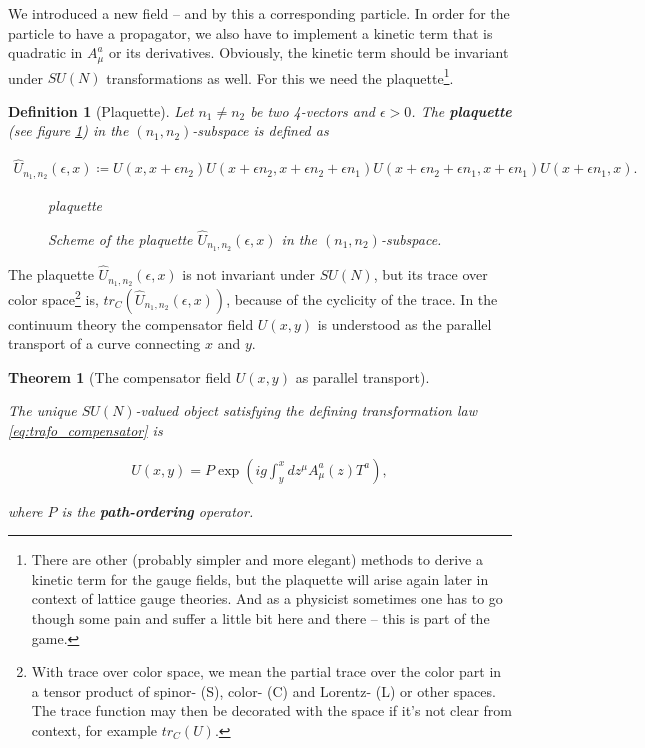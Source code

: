 \documentclass{article}
\theoremstyle{plain} %
\newtheorem{theorem}{Theorem}[section]
\newtheorem{definition}{Definition}[section]
\theoremstyle{convention} %
\theoremstyle{remark} %
\def\df#1{\textbf{\textit{#1}}}
\numberwithin{equation}{section}
\begin{document}
We introduced a new field -- and by this a corresponding particle. In order for the particle to have a propagator, we also have to implement a kinetic term that is quadratic in $A_{\mu}^a$ or its derivatives. Obviously, the kinetic term should be invariant under $SU(N)$ transformations as well. For this we need the plaquette\footnote{There are other (probably simpler and more elegant) methods to derive a kinetic term for the gauge fields, but the plaquette will arise again later in context of lattice gauge theories. And as a physicist sometimes one has to go though some pain and suffer a little bit here and there -- this is part of the game.}.

\begin{definition}[Plaquette]

Let $n_1 \neq n_2$ be two 4-vectors and $\epsilon > 0$. The \df{plaquette} (see figure \ref{fig:plaquette}) in the $(n_1, n_2)$-subspace is defined as 

\begin{align}
    \hat{U}_{n_1,n_2}(\epsilon,x) \coloneqq U(x, x + \epsilon n_2) U(x + \epsilon n_2, x + \epsilon n_2 + \epsilon n_1) U(x + \epsilon n_2 + \epsilon n_1, x + \epsilon n_1) U(x + \epsilon n_1, x).
\end{align}

\begin{figure}[H]
  \centering
  {plaquette}
  \caption{Scheme of the plaquette $\hat{U}_{n_1,n_2}(\epsilon,x)$ in the $(n_1, n_2)$-subspace.}
  \label{fig:plaquette}
\end{figure}

\end{definition}

The plaquette $\hat{U}_{n_1,n_2}(\epsilon,x)$ is not invariant under $SU(N)$, but its trace over color space\footnote{With trace over color space, we mean the partial trace over the color part in a tensor product of spinor- (S), color- (C) and Lorentz- (L) or other spaces. The trace function may then be decorated with the space if it's not clear from context, for example $tr_C(U)$.} is, $tr_C(\hat{U}_{n_1,n_2}(\epsilon,x))$, because of the cyclicity of the trace. In the continuum theory the compensator field $U(x,y)$ is understood as the parallel transport of a curve connecting $x$ and $y$.

\begin{theorem}[The compensator field $U(x,y)$ as parallel transport]

\label{thm:pexp}

The unique $SU(N)$-valued object satisfying the defining transformation law \eqref{eq:trafo_compensator} is

\begin{align}
    U(x,y) = P \exp( ig \int_{y}^{x} d z^{\mu} A_{\mu}^a(z) T^a ), \label{eq:realu}
\end{align}

where $P$ is the \df{path-ordering} operator.

\end{theorem}
\end{document}
